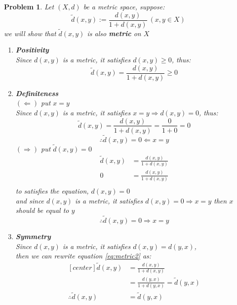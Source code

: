 \documentclass[a4paper,12pt]{article}
\newtheorem{prob}{Problem}[]
\begin{document}
\begin{prob}
	Let $(X,d)$ be a metric space, suppose:
	\begin{equation}\label{eq:metric2}
	\tilde{d}(x,y) := \frac{d(x,y)}{1+d(x,y)}\ (x,y\in X)
	\end{equation}
	we will show that $\tilde{d}(x,y)$ is also \textbf{metric} on $X$
	
	\begin{enumerate}[label=(\alph*)]
		\item \textbf{Positivity}\\
		Since $d(x,y)$ is a metric, it satisfies $d(x,y) \geq 0$, thus:
		\begin{equation*}
		\tilde{d}(x,y) = \frac{d(x,y)}{1+d(x,y)} \geq 0
		\end{equation*}
		\item \textbf{Definiteness}\\
		$(\Leftarrow)$ put $x=y$\\
		Since $d(x,y)$ is a metric, it satisfies $x=y \Rightarrow d(x,y)=0$, thus:
		\begin{equation*}
		\tilde{d}(x,y) = \frac{d(x,y)}{1+d(x,y)} = \frac{0}{1+0} = 0
		\end{equation*}
		\begin{equation*}
		\therefore \tilde{d}(x,y) = 0 \Leftarrow x = y
		\end{equation*}
		$(\Rightarrow)$ put $\tilde{d}(x,y) = 0$\\
		\begin{equation*}
		\begin{aligned}
		\tilde{d}(x,y) &= \frac{d(x,y)}{1+d(x,y)}\\
		0 &= \frac{d(x,y)}{1+d(x,y)}\\
		\end{aligned}
		\end{equation*}
		to satisfies the equation, $d(x,y) = 0$\\
		and since $d(x,y)$ is a metric, it satisfies $d(x,y) = 0 \Rightarrow x=y$
		then $x$ should be equal to $y$\\
		\begin{equation*}
		\therefore \tilde{d}(x,y) = 0 \Rightarrow x=y
		\end{equation*}
		\item \textbf{Symmetry}\\
		Since $d(x,y)$ is a metric, it satisfies $d(x,y) = d(y,x)$,\\
		then we can rewrite equation \eqref{eq:metric2} as:
		\begin{equation*}
		\begin{aligned}[center]
		\tilde{d}(x,y) &= \frac{d(x,y)}{1+d(x,y)}\\
		&= \frac{d(y,x)}{1+d(y,x)} = \tilde{d}(y,x)\\
		\therefore \tilde{d}(x,y) &= \tilde{d}(y,x)
		\end{aligned}
		\end{equation*}
		

\end{enumerate}
\end{prob}
\end{document}
